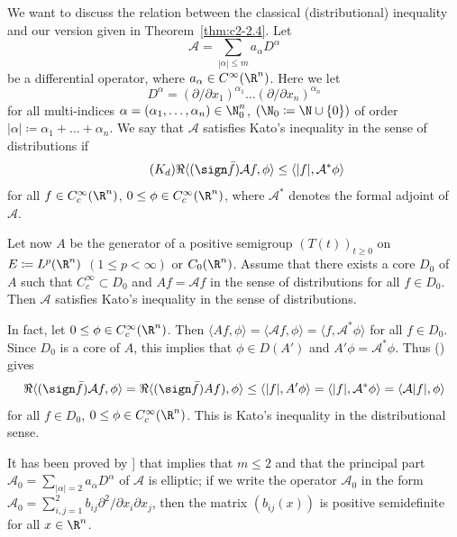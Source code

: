We want to discuss the relation between the classical (distributional) inequality and our version given in Theorem~\ref{thm:c2-2.4}.
Let 
\[
\mathcal{A} = \sum_{|\alpha| \leq m} a_{\alpha} D^{\alpha}
\]
be a differential operator, where $a_{\alpha} \in C^{\infty}(\R^n)$.
Here we let 
\[
D^{\alpha} = (\partial/\partial x_1)^{\alpha_1} \ldots (\partial/\partial x_{n})^{\alpha_{n}}
\]
for all multi-indices $\alpha = (\alpha_1,\ldots,\alpha_{n}) \in \N_{0}^n$, 
$(\N_{0} \coloneqq \N\cup\{0\})$ of order $|\alpha| \coloneqq \alpha_1 + \ldots + \alpha_{n}$.
We say that $\mathcal{A}$ satisfies Kato's inequality in the sense of distributions if
\begin{equation}\label{eq:c2-Kd} \tag{$K_{d}$}
\Re\langle(\sign \bar{f})\mathcal{A}f, \phi \rangle \leq \langle|f|, \mathcal{A}^{*}\phi \rangle
\end{equation}
for all $f \in C_{c}^{\infty}(\R^n)$, $0 \leq \phi \in C_{c}^{\infty}(\R^n)$, where $\mathcal{A}^{*}$ denotes the formal adjoint of\/ $\mathcal{A}$. 

Let now $A$ be the generator of a positive semigroup $(T(t))_{t \geq 0}$ on $E \coloneqq L^p(\R^n)$ $(1 \leq p < \infty)$ or $C_{0}(\R^n)$.
Assume that there exists a core
$D_{0}$ of\/ $A$ such that $C_{c}^{\infty} \subset D_{0}$ and $Af = \mathcal{A}f$ in the sense of distributions for all $f \in D_{0}$.
Then $\mathcal{A}$ satisfies Kato's inequality in the sense of distributions.

In fact, let $0 \leq \phi \in C_{c}^{\infty}(\R^n)$.
Then $\langle Af,\phi \rangle = \langle \mathcal{A}f,\phi \rangle = \langle f,\mathcal{A}^{*}\phi \rangle$ for all $f \in D_{0}$.
Since $D_{0}$ is a core of\/ $A$, this implies that $\phi \in D(A')$ and $A'\phi = \mathcal{A}^{*}\phi$.
Thus ()   gives 
%
\[
	\Re\langle(\sign \bar{f})\mathcal{A}f,\phi \rangle = \Re\langle(\sign \bar{f})Af),\phi \rangle \leq \langle |f|,A'\phi \rangle = \langle |f|,\mathcal{A}^{*}\phi \rangle = \langle \mathcal{A}|f|,\phi \rangle
\]
%
for all $f \in D_{0}$, $0 \leq \phi \in C_{c}^{\infty}(\R^n)$.
This is Kato's inequality in the distributional sense.
\begin{remark*}\label{rem:c2-3.0}
It has been proved by \textcite{miyajimaokazawa:1984}] that  implies that $m \leq 2$ and that the principal part $\mathcal{A}_{0} = \sum_{|\alpha|=2} a_{\alpha} D^{\alpha}$ of\/ $\mathcal{A}$ is elliptic; \ie if we write the operator $\mathcal{A}_{0}$ in the form $\mathcal{A}_{0} = \sum_{i,j=1}^{2} b_{ij} \partial^{2}/\partial x_{i} \partial x_{j}$, then the matrix $(b_{ij}(x))$ is positive semidefinite for all $x \in \R^n$.
\end{remark*}

